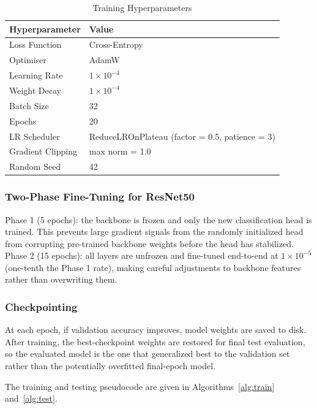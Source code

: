 \documentclass[12pt, letterpaper]{article}
\begin{document}
\begin{table}[h!]
    \centering
    \caption{Training Hyperparameters}
    \label{tab:hyperparams}
    \begin{tabular}{@{}L{5.5cm} L{6cm}@{}}
        \toprule
        \textbf{Hyperparameter} & \textbf{Value} \\
        \midrule
        Loss Function    & Cross-Entropy \\
        Optimiser        & AdamW \\
        Learning Rate    & $1 \times 10^{-4}$ \\
        Weight Decay     & $1 \times 10^{-4}$ \\
        Batch Size       & 32 \\
        Epochs           & 20 \\
        LR Scheduler     & ReduceLROnPlateau (factor = 0.5, patience = 3) \\
        Gradient Clipping & max norm = 1.0 \\
        Random Seed      & 42 \\
        \bottomrule
    \end{tabular}
\end{table}

\subsubsection{Two-Phase Fine-Tuning for ResNet50}

Phase 1 (5 epochs): the backbone is frozen and only the new classification head is
trained. This prevents large gradient signals from the randomly initialized head from corrupting pre-trained backbone weights before the head has stabilized. Phase 2 (15 epochs): all layers are unfrozen and fine-tuned end-to-end at $1 \times 10^{-5}$ (one-tenth the Phase 1 rate), making careful adjustments to backbone features rather than overwriting them.

\subsubsection{Checkpointing}

At each epoch, if validation accuracy improves, model weights are saved to disk.
After training, the best-checkpoint weights are restored for final test evaluation, so the evaluated model is the one that generalized best to the validation set rather than the potentially overfitted final-epoch model.

The training and testing pseudocode are given in Algorithms~\ref{alg:train}
and~\ref{alg:test}.
\end{document}
